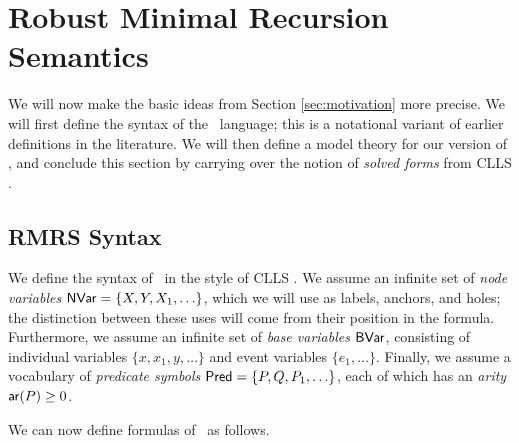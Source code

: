 \section{Robust Minimal Recursion Semantics}
\label{sec:rmrs}

We will now make the basic ideas from Section \ref{sec:motivation}
more precise.  We will first define the syntax of the \rmrs\ language;
this is a notational variant of earlier definitions in the
literature.  We will then define a model theory for our version of
\rmrs, and conclude this section by carrying over the notion of
\emph{solved forms} from CLLS \cite{egg:etal:2001}.



\subsection{RMRS Syntax}

We define the syntax of \rmrs\ in the style of CLLS
\cite{egg:etal:2001}.  We assume an infinite set of {\em node
  variables} $\mathsf{NVar}=\{X,Y,X_1,\ldots\}$, which we will use as labels,
anchors, and holes; the distinction between these uses will come from
their position in the formula.  Furthermore, we assume an infinite set
of \emph{base variables} $\mathsf{BVar}$, consisting of individual variables
$\{x,x_1,y,\ldots\}$ and event variables $\{e_1,\ldots\}$.  Finally,
we assume a vocabulary of \emph{predicate symbols}
$\mathsf{Pred}=\{P,Q,P_1,\ldots\}$, each of which has an \emph{arity} $\mathsf{ar}(P)
\geq 0$.

We can now define formulas of \rmrs\ as follows.

